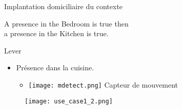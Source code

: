 \begin{frame}{Implantation domiciliaire du contexte}
  \addtocounter{framenumber}{-1}
  \begin{minipage}{.48\linewidth}
  \end{minipage}
  \hfill
  \begin{minipage}{.48\linewidth}
    \begin{coloredbox}[black]{}
      \begin{scriptsize}
        A presence in the Bedroom is true then\\ a presence in the Kitchen is true.%
      \end{scriptsize}
    \end{coloredbox}
  \end{minipage}
  \vfill

  \begin{minipage}{0.45\linewidth}
    \begin{coloredbox}[teal]{Lever}
      \small
      \begin{itemize}
      \item Présence dans la cuisine.
        \begin{itemize}
        \item \texttt{[image: mdetect.png]} Capteur de mouvement
        \end{itemize}
      \end{itemize}
    \end{coloredbox}
  \end{minipage}
  \hfill
  \begin{minipage}{0.50\linewidth}
    \begin{figure}
      \texttt{[image: use\_case1\_2.png]}
    \end{figure}
  \end{minipage}
\end{frame}

